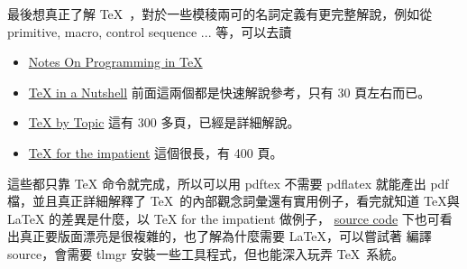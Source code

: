  最後想真正了解 \TeX\ ，對於一些模稜兩可的名詞定義有更完整解說，例如從
  primitive, macro, control sequence ... 等，可以去讀
  \begin{itemize}
    \item \href{http://mirrors.ctan.org/graphics/pgf/contrib/pgfplots/doc/TeX-programming-notes.pdf}
      {Notes On Programming in \TeX}
    \item \href{http://mirrors.ctan.org/info/tex-nutshell/tex-nutshell.pdf}
      {\TeX{} in a Nutshell} 前面這兩個都是快速解說參考，只有 30 頁左右而已。
    \item \href{http://mirrors.ctan.org/info/texbytopic/TeXbyTopic.pdf}
      {\TeX{} by Topic} 這有 300 多頁，已經是詳細解說。
    \item \href{https://ctan.org/tex-archive/info/impatient/book.pdf}
      {{\TeX} for the impatient} 這個很長，有 400 頁。
  \end{itemize}
  這些都只靠 \TeX{} 命令就完成，所以可以用 pdftex 不需要 pdflatex 就能產出 pdf
  檔，並且真正詳細解釋了 \TeX\ 的內部觀念詞彙還有實用例子，看完就知道 \TeX{}與
  \LaTeX{} 的差異是什麼，以 \TeX{} for the impatient 做例子，
  \href{https://mirrors.ctan.org/info/impatient.zip}{source code}
  下也可看出真正要版面漂亮是很複雜的，也了解為什麼需要 \LaTeX{}，可以嘗試著
  編譯 source，會需要 tlmgr 安裝一些工具程式，但也能深入玩弄 \TeX\ 系統。

